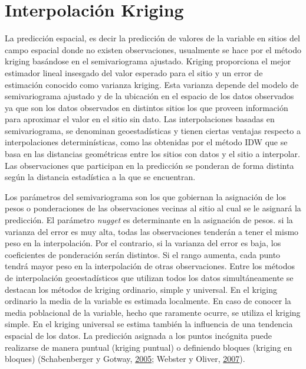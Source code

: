 \documentclass[11pt,b5paper,]{krantz}
\begin{document}
\hypertarget{interpolaciuxf3n-kriging}{%
\section{Interpolación Kriging}\label{interpolaciuxf3n-kriging}}

La predicción espacial, es decir la predicción de valores de la variable en sitios del campo espacial donde no existen observaciones, usualmente se hace por el método kriging basándose en el semivariograma ajustado. Kriging proporciona el mejor estimador lineal insesgado del valor esperado para el sitio y un error de estimación conocido como varianza kriging. Esta varianza depende del modelo de semivariograma ajustado y de la ubicación en el espacio de los datos observados ya que son los datos observados en distintos sitios los que proveen información para aproximar el valor en el sitio sin dato. Las interpolaciones basadas en semivariograma, se denominan geoestadísticas y tienen ciertas ventajas respecto a interpolaciones determinísticas, como las obtenidas por el método IDW que se basa en las distancias geométricas entre los sitios con datos y el sitio a interpolar. Las observaciones que participan en la predicción se ponderan de forma distinta según la distancia estadística a la que se encuentran.

Los parámetros del semivariograma son los que gobiernan la asignación de los pesos o ponderaciones de las observaciones vecinas al sitio al cual se le asignará la predicción. El parámetro \emph{nugget} es determinante en la asignación de pesos. si la varianza del error es muy alta, todas las observaciones tenderán a tener el mismo peso en la interpolación. Por el contrario, si la varianza del error es baja, los coeficientes de ponderación serán distintos. Si el rango aumenta, cada punto tendrá mayor peso en la interpolación de otras observaciones. Entre los métodos de interpolación geoestadísticos que utilizan todos los datos simultáneamente se destacan los métodos de kriging ordinario, simple y universal. En el kriging ordinario la media de la variable es estimada localmente. En caso de conocer la media poblacional de la variable, hecho que raramente ocurre, se utiliza el kriging simple. En el kriging universal se estima también la influencia de una tendencia espacial de los datos. La predicción asignada a los puntos incógnita puede realizarse de manera puntual (kriging puntual) o definiendo bloques (kriging en bloques) (Schabenberger y Gotway, \protect\hyperlink{ref-Schabenberger_Gotway_2005}{2005}; Webster y Oliver, \protect\hyperlink{ref-Webster_Oliver_2007}{2007}).
\end{document}
